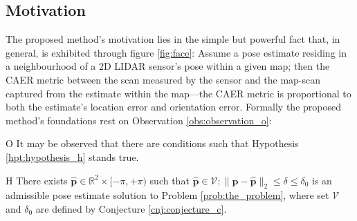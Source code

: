\subsection{Motivation}

The proposed method's motivation lies in the simple but powerful fact that, in
general, is exhibited through figure \ref{fig:face}: Assume a pose estimate
residing in a neighbourhood of a 2D LIDAR sensor's pose within a given map;
then the CAER metric between the scan measured by the sensor and the map-scan
captured from the estimate within the map---the CAER metric is proportional to
both the estimate's location error and orientation error.
Formally the proposed method's foundations rest on Observation
\ref{obs:observation_o}:

\begin{customobs}{O}
  \label{obs:observation_o} It may be observed that there are conditions such
  that Hypothesis \ref{hpt:hypothesis_h} stands true.
\end{customobs}

\begin{customhpt}{H}
  \label{hpt:hypothesis_h}
  There exists $\hat{\bm{p}} \in  \mathbb{R}^2 \times [-\pi,+\pi)$ such that
  $\hat{\bm{p}} \in \mathcal{V}: \|\bm{p}-\hat{\bm{p}}\|_2 \leq \delta \leq \delta_0$
  is an admissible pose estimate solution to Problem \ref{prob:the_problem},
  where set $\mathcal{V}$ and $\delta_0$ are defined by Conjecture
  \ref{cnj:conjecture_c}.
\end{customhpt}

